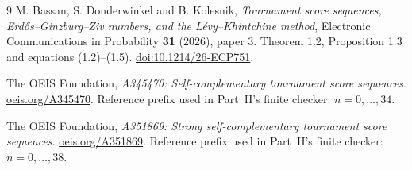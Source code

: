 \documentclass[11pt,letterpaper]{article}
\theoremstyle{definition}\newtheorem{remark}[theorem]{Remark}
\begin{document}
\begin{thebibliography}{9}
M. Bassan, S. Donderwinkel and B. Kolesnik,
\emph{Tournament score sequences, Erd\H{o}s--Ginzburg--Ziv numbers,
and the L\'evy--Khintchine method},
Electronic Communications in Probability \textbf{31} (2026), paper 3.
Theorem 1.2, Proposition 1.3 and equations (1.2)--(1.5).
\href{https://doi.org/10.1214/26-ECP751}{doi:10.1214/26-ECP751}.

The OEIS Foundation, \emph{A345470: Self-complementary tournament score sequences}.
\href{https://oeis.org/A345470}{oeis.org/A345470}.
Reference prefix used in Part~II's finite checker: $n=0,\ldots,34$.

The OEIS Foundation, \emph{A351869: Strong self-complementary tournament score sequences}.
\href{https://oeis.org/A351869}{oeis.org/A351869}.
Reference prefix used in Part~II's finite checker: $n=0,\ldots,38$.
\end{thebibliography}
\end{document}
